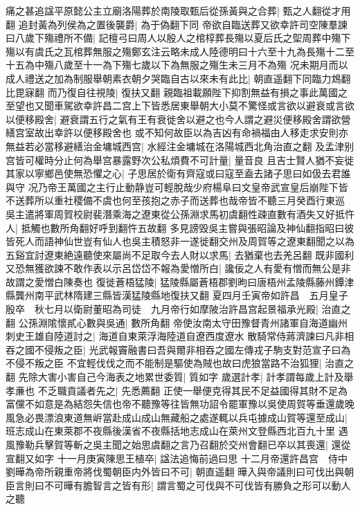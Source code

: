 痛之甚追諡平原懿公主立廟洛陽葬於南陵取甄后從孫黃與之合葬|{
	甄之人翻從才用翻}
追封黃為列侯為之置後襲爵|{
	為于偽翻下同}
帝欲自臨送葬又欲幸許司空陳羣諫曰八歲下殤禮所不備|{
	記檀弓曰周人以殷人之棺椁葬長殤以夏后氏之堲周葬中殤下殤以有虞氏之瓦棺葬無服之殤鄭玄注云略未成人陸德明曰十六至十九為長殤十二至十五為中殤八歲至十一為下殤七歲以下為無服之殤生未三月不為殤}
况未期月而以成人禮送之加為制服舉朝素衣朝夕哭臨自古以來未有此比|{
	朝直遥翻下同臨力鴆翻比毘寐翻}
而乃復自往視陵|{
	復扶又翻}
親臨祖載願陛下抑割無益有損之事此萬國之至望也又聞車駕欲幸許昌二宫上下皆悉居東舉朝大小莫不驚怪或言欲以避衰或言欲以便移殿舍|{
	避衰謂五行之氣有王有衰徙舍以避之也今人謂之避災便移殿舍謂欲營繕宫室故出幸許以便移殿舍也}
或不知何故臣以為吉凶有命禍福由人移走求安則亦無益若必當移避繕治金墉城西宫|{
	水經注金墉城在洛陽城西北角治直之翻}
及孟津别宫皆可權時分止何為舉宫暴露野次公私煩費不可計量|{
	量音良}
且吉士賢人猶不妄徙其家以寧鄉邑使無恐懼之心|{
	子思居於衛有齊寇或曰寇至盍去諸子思曰如伋去君誰與守}
况乃帝王萬國之主行止動静豈可輕脫哉少府楊阜曰文皇帝武宣皇后崩陛下皆不送葬所以重社稷備不虞也何至孩抱之赤子而送葬也哉帝皆不聽三月癸酉行東巡　吳主遣將軍周賀校尉裴潛乘海之遼東從公孫淵求馬初虞翻性疎直數有酒失又好抵忤人|{
	抵觸也數所角翻好呼到翻忤五故翻}
多見謗毁吳主嘗與張昭論及神仙翻指昭曰彼皆死人而語神仙世豈有仙人也吳主積怒非一遂徙翻交州及周賀等之遼東翻聞之以為五谿宜討遼東絶遠聽使來屬尚不足取今去人財以求馬|{
	去猶棄也去羌呂翻}
既非國利又恐無獲欲諫不敢作表以示呂岱岱不報為愛憎所白|{
	讒佞之人有愛有憎而無公是非故謂之愛憎白陳奏也}
復徙蒼梧猛陵|{
	猛陵縣屬蒼梧郡劉昫曰唐梧州孟陵縣藤州鐔津縣龔州南平武林隋建三縣皆漢猛陵縣地復扶又翻}
夏四月壬寅帝如許昌　五月皇子殷卒　秋七月以衛尉董昭為司徒　九月帝行如摩陂治許昌宫起景福承光殿|{
	治直之翻}
公孫淵隂懷貳心數與吳通|{
	數所角翻}
帝使汝南太守田豫督青州諸軍自海道幽州刺史王雄自陸道討之|{
	海道自東萊浮海陸道自遼西度遼水}
散騎常侍蔣濟諫曰凡非相吞之國不侵叛之臣|{
	光武報竇融書曰吾與爾非相吞之國左傳戎子駒支對范宣子曰為不侵不叛之臣}
不宜輕伐伐之而不能制是驅使為賊也故曰虎狼當路不治狐狸|{
	治直之翻}
先除大害小害自己今海表之地累世委質|{
	質如字}
歲選計孝|{
	計孝謂每歲上計及舉孝亷也}
不乏職貢議者先之|{
	先悉薦翻}
正使一舉便克得其民不足益國得其財不足為富儻不如意是為結怨失信也帝不聽豫等往皆無功詔令罷軍豫以吳使周賀等垂還歲晚風急必畏漂浪東道無㟁當赴成山成山無藏船之處遂輒以兵屯據成山賀等還至成山|{
	班志成山在東萊郡不夜縣後漢省不夜縣括地志成山在萊州文登縣西北百九十里}
遇風豫勒兵擊賀等斬之吳主聞之始思虞翻之言乃召翻於交州會翻已卒以其喪還|{
	還從宣翻又如字}
十一月庚寅陳思王植卒|{
	諡法追悔前過曰思}
十二月帝還許昌宫　侍中劉曄為帝所親重帝將伐蜀朝臣内外皆曰不可|{
	朝直遥翻}
曄入與帝議則曰可伐出與朝臣言則曰不可曄有膽智言之皆有形|{
	謂言蜀之可伐與不可伐皆有勝負之形可以動人之聽}
